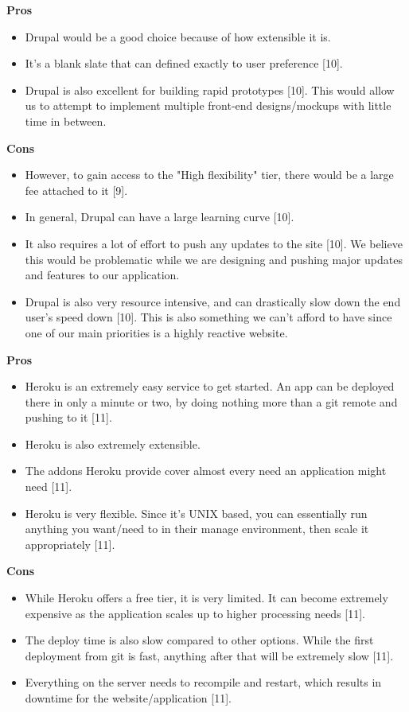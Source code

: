 		\textbf{Pros} 
			\begin{itemize}
				\item Drupal would be a good choice because of how extensible it is. 
				\item It's a blank slate that can defined exactly to user preference [10]. 
				\item Drupal is also excellent for building rapid prototypes [10]. This would allow us to attempt to implement multiple front-end designs/mockups with little time in between.
			\end{itemize}
		\textbf{Cons}
			\begin{itemize}
				\item However, to gain access to the "High flexibility" tier, there would be a large fee attached to it [9]. 
				\item In general, Drupal can have a large learning curve [10]. 
				\item It also requires a lot of effort to push any updates to the site [10]. We believe this would be problematic while we are designing and pushing major updates and features to our application. 
				\item Drupal is also very resource intensive, and can drastically slow down the end user's speed down [10]. This is also something we can't afford to have since one of our main priorities is a highly reactive website.
			\end{itemize}
			
		\textbf{Pros} 
			\begin{itemize}
				\item Heroku is an extremely easy service to get started. An app can be deployed there in only a minute or two, by doing nothing more than a git remote and pushing to it [11]. 
				\item Heroku is also extremely extensible.
				\item The addons Heroku provide cover almost every need an application might need [11]. 
				\item Heroku is very flexible. Since it's UNIX based, you can essentially run anything you want/need to in their manage environment, then scale it appropriately [11].
			\end{itemize}
		\textbf{Cons}
			\begin{itemize}
				\item While Heroku offers a free tier, it is very limited. It can become extremely expensive as the application scales up to higher processing needs [11]. 
				\item The deploy time is also slow compared to other options. While the first deployment from git is fast, anything after that will be extremely slow [11]. 
				\item Everything on the server needs to recompile and restart, which results in downtime for the website/application [11].
			\end{itemize}
			
